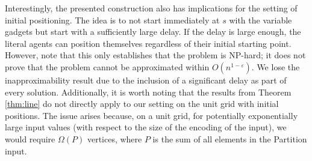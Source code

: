 Interestingly, the presented construction also has implications for the setting of initial positioning. %
The idea is to not start immediately at $s$ with the variable gadgets but start with a sufficiently large delay. If the delay is large enough, the literal agents can position themselves regardless of their initial starting point. However, note that this only establishes that the problem is NP-hard; it does not prove that the problem cannot be approximated within $O(n^{1-\varepsilon})$. We lose the inapproximability result due to the inclusion of a significant delay as part of every solution. Additionally, it is worth noting that the results from Theorem \ref{thm:line} do not directly apply to our setting on the unit grid with initial positions. The issue arises because, on a unit grid, for potentially exponentially large input values (with respect to the size of the encoding of the input), we would require $\Omega(P)$ vertices, where 
$P$ is the sum of all elements in the Partition input.




 




